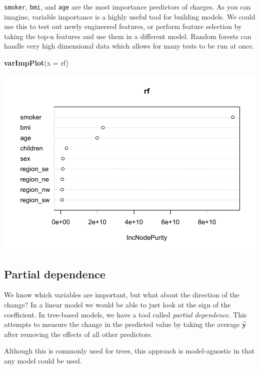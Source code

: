 \documentclass[openany]{book}
\newenvironment{Shaded}{\begin{snugshade}}{\end{snugshade}}
\newcommand{\DataTypeTok}[1]{\textcolor[rgb]{0.13,0.29,0.53}{#1}}
\newcommand{\KeywordTok}[1]{\textcolor[rgb]{0.13,0.29,0.53}{\textbf{#1}}}
\newcommand{\NormalTok}[1]{#1}
\begin{document}
\texttt{smoker}, \texttt{bmi}, and \texttt{age} are the most importance predictors of charges. As you can imagine, variable importance is a highly useful tool for building models. We could use this to test out newly engineered features, or perform feature selection by taking the top-n features and use them in a different model. Random forests can handle very high dimensional data which allows for many tests to be run at once.

\begin{Shaded}
\begin{Highlighting}[]
\KeywordTok{varImpPlot}\NormalTok{(}\DataTypeTok{x =}\NormalTok{ rf)}
\end{Highlighting}
\end{Shaded}

\includegraphics{06-tree-based-models_files/figure-latex/unnamed-chunk-16-1.pdf}

\hypertarget{partial-dependence}{%
\subsection{Partial dependence}\label{partial-dependence}}

We know which variables are important, but what about the direction of the change? In a linear model we would be able to just look at the sign of the coefficient. In tree-based models, we have a tool called \emph{partial dependence}. This attempts to measure the change in the predicted value by taking the average \(\hat{\mathbf{y}}\) after removing the effects of all other predictors.

Although this is commonly used for trees, this approach is model-agnostic in that any model could be used.
\end{document}
